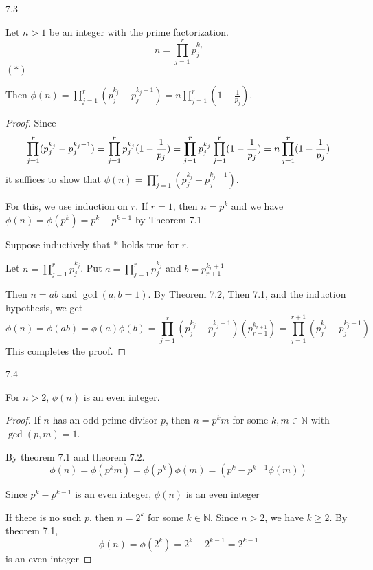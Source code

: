 \begin{theorem}
    7.3

    Let $n > 1$ be an integer with the prime factorization.
    \[
        n = \prod_{j=1}^{r}{p_j^{k_j}}
    \]
    \hfill $(*)$

    Then $\displaystyle \phi(n) = \prod_{j=1}^{r}{(p_j^{k_j} - p_j^{k_j-1})} = n \prod_{j=1}^{r}{(1-\frac{1}{p_j})}$.
\end{theorem}
\begin{proof}
    Since
    \[
        \prod_{j=1}^{r}(p_j^{k_j} - p_j^{k_j-1}) = \prod_{j=1}^{r}{p_j^{k_j}(1-\frac{1}{p_j})}\\
        = \prod_{j=1}^{r}{p_j^{k_j}} \prod_{j=1}^{r}(1-\frac{1}{p_j})
        = n \prod_{j=1}^{r}(1-\frac{1}{p_j})
    \]
    it suffices to show that $\phi(n) = \prod_{j=1}^{r}{(p_j^{k_j} - p_j^{k_j-1})}$.

    For this, we use induction on $r$. If $r = 1$, then $n = p^k$ and we have $\phi(n) = \phi(p^k) = p^k - p^{k-1}$ by Theorem 7.1

    Suppose inductively that * holds true for $r$.

    Let $n = \prod_{j=1}^{r}{p_j^{k_j}}$. Put $a = \prod_{j=1}^{r}{p_j^{k_j}}$ and $b = p_{r+1}^{k_r+1}$

    Then $n = ab$ and $\gcd(a, b = 1)$. By Theorem 7.2, Then 7.1, and the induction hypothesis, we get
    \[
        \phi(n) = \phi(ab) = \phi(a) \phi(b)
        = \prod_{j=1}^{r}{(p_j^{k_j} - p_j^{k_j-1})} (p_{r+1}^{k_{r+1}})
        = \prod_{j=1}^{r+1}(p_j^{k_j} - p_j^{k_j-1})
    \]
    This completes the proof.
\end{proof}

\begin{theorem}
    7.4

    For $n > 2$, $\phi(n)$ is an even integer.
\end{theorem}
\begin{proof}
    If $n$ has an odd prime divisor $p$, then $n = p^k m$ for some $k, m \in \mathbb{N}$
    with $\gcd(p, m) = 1$.

    By theorem 7.1 and theorem 7.2.
    \[
        \phi(n) = \phi(p^k m) = \phi(p^k) \phi(m) = (p^k - p^{k - 1} \phi(m))
    \]

    Since $p^k - p^{k-1}$ is an even integer, $\phi(n)$ is an even integer

    If there is no such $p$, then $n = 2^k$ for some $k \in \mathbb{N}$.
    Since $n > 2$, we have $k \geq 2$. By theorem 7.1,
    \[
        \phi(n) = \phi(2^k) = 2^k - 2^{k-1} = 2^{k-1}
    \]
    is an even integer
\end{proof}

